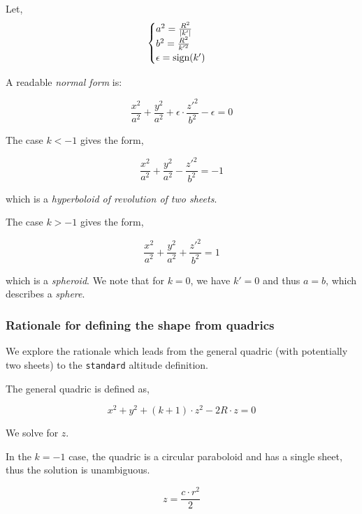 Let,
\begin{equation} \begin{cases}
a^2 = \frac{R^2}{\abs{k'}} \\
b^2 = \frac{R^2}{k'^2} \\
\epsilon = \textrm{sign}(k')
\end{cases} \end{equation}

A readable \emph{normal form} is:

\begin{equation}
\frac{x^2}{a^2} + \frac{y^2}{a^2} + \epsilon \cdot \frac{z'^2}{b^2} - \epsilon
  = 0
\end{equation}

The case $k < -1$ gives the form,

\begin{equation}
\frac{x^2}{a^2} + \frac{y^2}{a^2} - \frac{z'^2}{b^2} = -1
\end{equation}

which is a \emph{hyperboloid of revolution of two sheets}.

The case $k > -1$ gives the form,

\begin{equation}
\frac{x^2}{a^2} + \frac{y^2}{a^2} + \frac{z'^2}{b^2} = 1
\end{equation}

which is a \emph{spheroid}. We note that for $k=0$, we have
$k'=0$ and thus $a=b$, which describes a \emph{sphere}.

\subsubsection{Rationale for defining the shape from quadrics}
We explore the rationale which leads from the general quadric (with potentially
two sheets) to the \lstinline{standard} altitude definition.

The general quadric is defined as,

\begin{equation}
x^2 + y^2 + (k+1) \cdot z^2 - 2 R \cdot z = 0
\end{equation}

We solve for $z$.

In the $k=-1$ case, the quadric is a circular paraboloid and has a single
sheet, thus the solution is unambiguous.

\begin{equation}
z = \frac{c \cdot r^2}{2}
\end{equation}

